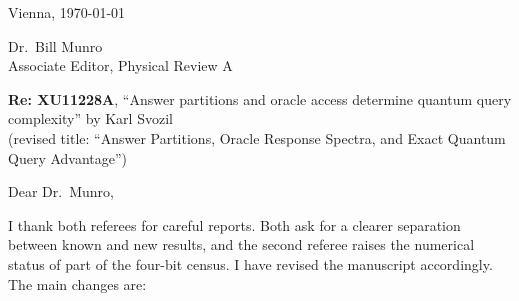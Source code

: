 \documentclass[11pt]{article}
\begin{document}
\begin{flushright}
Vienna, \today
\end{flushright}

Dr.~Bill Munro\\
Associate Editor, Physical Review A

\textbf{Re: XU11228A}, ``Answer partitions and oracle access determine quantum
query complexity'' by Karl Svozil\\
(revised title: ``Answer Partitions, Oracle Response Spectra, and Exact Quantum Query Advantage'')

Dear Dr.~Munro,

I thank both referees for careful reports. Both ask for a clearer separation
between known and new results, and the second referee raises the numerical
status of part of the four-bit census. I have revised the manuscript
accordingly. The main changes are:
\end{document}
